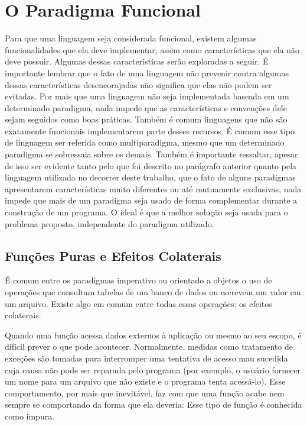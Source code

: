 \chapter{O Paradigma Funcional}

Para que uma linguagem seja considerada funcional, existem 
algumas funcionalidades que ela deve implementar, assim 
como características que ela não deve possuir. Algumas dessas 
características serão exploradas a seguir. É importante 
lembrar que o fato de uma linguagem não prevenir contra 
algumas dessas características desencorajadas não significa 
que elas não podem ser evitadas. Por mais que uma linguagem 
não seja implementada baseada em um determinado paradigma, 
nada impede que as características e convenções dele sejam 
seguidos como boas práticas. Também é comum linguagens que 
não são exatamente funcionais implementarem parte desses 
recursos. É comum esse tipo de linguagem ser referida como 
multiparadigma, mesmo que um determinado paradigma se 
sobressaia sobre os demais.
Também é importante ressaltar, apesar de isso ser 
evidente tanto pelo que foi descrito no parágrafo anterior 
quanto pela linguagem utilizada no decorrer deste trabalho, 
que o fato de alguns paradigmas apresentarem características 
muito diferentes ou até mutuamente exclusivas, nada impede 
que mais de um paradigma seja usado de forma complementar 
durante a construção de um programa. O ideal é que a melhor 
solução seja usada para o problema proposto, independente 
do paradigma utilizado.


\section{Funções Puras e Efeitos Colaterais}

É comum entre os paradigmas imperativo ou orientado a objetos 
o uso de operações que consultam tabelas de um banco de dados 
ou escrevem um valor em um arquivo. Existe algo em comum 
entre todas essas operações: os efeitos colaterais. 

Quando uma função acessa dados externos à aplicação ou 
mesmo ao seu escopo, é difícil prever o que pode acontecer. 
Normalmente, medidas como tratamento de exceções são tomadas 
para interromper uma tentativa de acesso mau sucedida cuja 
causa não pode ser reparada pelo programa (por exemplo, 
o usuário fornecer um nome para um arquivo que não existe e 
o programa tenta acessá-lo). Esse comportamento, por mais 
que inevitável, faz com que uma função acabe nem sempre se 
comportando da forma que ela deveria: Esse tipo de função é 
conhecida como impura.

